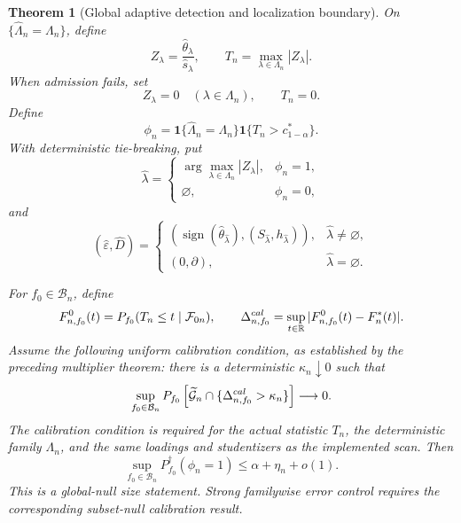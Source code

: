 \documentclass[10pt,a4paper]{amsart}
\newtheorem{theorem}{Theorem}
\begin{document}
\begin{theorem}[Global adaptive detection and localization boundary]
On \(\{\widehat\Lambda_n=\Lambda_n\}\), define
\[
Z_\lambda
=
\frac{\widehat\theta_\lambda}{\widehat s_\lambda},
\qquad
T_n
=
\max_{\lambda\in\Lambda_n}|Z_\lambda|.
\]
When admission fails, set
\[
Z_\lambda=0
\quad(\lambda\in\Lambda_n),
\qquad
T_n=0.
\]
Define
\[
\phi_n
=
\mathbf 1\{\widehat\Lambda_n=\Lambda_n\}
\mathbf 1\{T_n>c_{1-\alpha}^*\}.
\]
With deterministic tie-breaking, put
\[
\widehat\lambda
=
\begin{cases}
\displaystyle
\arg\max_{\lambda\in\Lambda_n}|Z_\lambda|,
&\phi_n=1,\\[2mm]
\varnothing,&\phi_n=0,
\end{cases}
\]
and
\[
(\widehat\varepsilon,\widehat D)
=
\begin{cases}
\left(
\operatorname{sign}(\widehat\theta_{\widehat\lambda}),
(S_{\widehat\lambda},h_{\widehat\lambda})
\right),
&\widehat\lambda\ne\varnothing,\\[1mm]
(0,\partial),
&\widehat\lambda=\varnothing.
\end{cases}
\]

For \(f_0\in\mathcal B_n\), define
\[
F_{n,f_0}^{0}(t)
=
P_{f_0}(T_n\le t\mid\mathcal F_{0n}),
\qquad
\Delta_{n,f_0}^{\rm cal}
=
\sup_{t\in\mathbb R}
|F_{n,f_0}^{0}(t)-F_n^*(t)|.
\]
Assume the following uniform calibration condition, as established
by the preceding multiplier theorem: there is a deterministic
\(\kappa_n\downarrow0\) such that
\begin{equation}
\sup_{f_0\in\mathcal B_n}
P_{f_0}\left[
\widetilde{\mathcal G}_n
\cap
\{\Delta_{n,f_0}^{\rm cal}>\kappa_n\}
\right]
\longrightarrow0.
\label{eq:t3-15}
\end{equation}
The calibration condition is required for the actual statistic
\(T_n\), the deterministic family \(\Lambda_n\), and the same
loadings and studentizers as the implemented scan.  Then
\begin{equation}
\sup_{f_0\in\mathcal B_n}
P_{f_0}^\dagger(\phi_n=1)
\le
\alpha+\eta_n+o(1).
\label{eq:t3-16}
\end{equation}
This is a global-null size statement.  Strong familywise error
control requires the corresponding subset-null calibration result.


\end{theorem}
\end{document}
